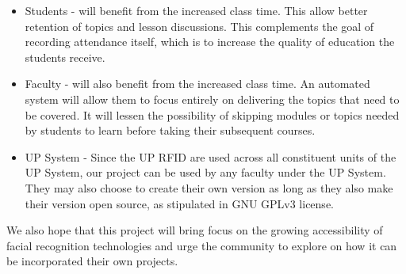 	\begin{itemize}
		\item Students - will benefit from the increased class time. This allow better retention of topics and lesson discussions. This complements the goal of recording attendance itself, which is to increase the quality of education the students receive.
	\end{itemize}
	\begin{itemize}
		\item Faculty - will also benefit from the increased class time. An automated system will allow them to focus entirely on delivering the topics that need to be covered. It will lessen the possibility of skipping modules or topics needed by students to learn before taking their subsequent courses. 
	\end{itemize}
	\begin{itemize}
		\item UP System - Since the UP RFID are used across all constituent units of the UP System, our project can be used by any faculty under the UP System. They may also choose to create their own version as long as they also make their version open source, as stipulated in GNU GPLv3 license.
	\end{itemize}
	
	
	We also hope that this project will bring focus on the growing accessibility of facial recognition technologies and urge the community to explore on how it can be incorporated their own projects.
	
\begin{comment}
	content...%
	\begin{itemize}
		\item  What is the relevance of your work to the computer science community? 
		
		\begin{itemize} 
			\item What will be your technical contributions, in terms of algorithms, or approaches, or new domain? 
			\item What is your value-added compared to existing systems? 
		\end{itemize}
		
		\item What will be your contributions to society in general? 
		\begin{itemize}
			\item Who will benefit from your system? 
			\item Who are your target users and how will this system benefit them? 
		\end{itemize}
	\end{itemize}
	
		If applicable, describe possible commercialization and/or innovation in your research.

\end{comment}


